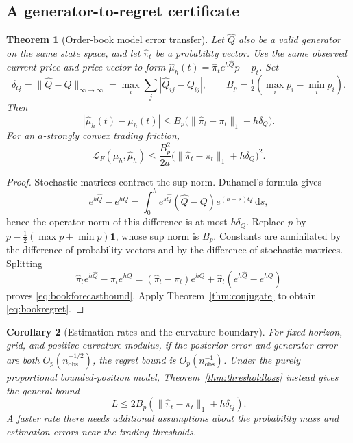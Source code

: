 \documentclass[11pt]{article}
\theoremstyle{plain}
\newtheorem{theorem}{Theorem}[section]
\newtheorem{corollary}[theorem]{Corollary}
\theoremstyle{definition}
\theoremstyle{remark}
\newcommand{\dd}{\,\mathrm d}
\newcommand{\norm}[1]{\lVert#1\rVert}
\begin{document}
\subsection{A generator-to-regret certificate}

\begin{theorem}[Order-book model error transfer]\label{thm:booktransfer}
Let \(\widehat Q\) also be a valid generator on the same state space,
and let \(\widehat\pi_t\) be a probability vector. Use the same observed
current price and price vector to form
\(\widehat\mu_h(t)=\widehat\pi_t e^{h\widehat Q}p-p_t\).
Set
\[
\delta_Q=\norm{\widehat Q-Q}_{\infty\to\infty}
=\max_i\sum_j|\widehat Q_{ij}-Q_{ij}|,\qquad
B_p=\tfrac12(\max_i p_i-\min_i p_i).
\]
Then
\begin{equation}\label{eq:bookforecastbound}
|\widehat\mu_h(t)-\mu_h(t)|
\le B_p\big(\norm{\widehat\pi_t-\pi_t}_1+h\delta_Q\big).
\end{equation}
For an \(a\)-strongly convex trading friction,
\begin{equation}\label{eq:bookregret}
\mathcal L_F(\mu_h,\widehat\mu_h)
\le\frac{B_p^2}{2a}
\big(\norm{\widehat\pi_t-\pi_t}_1+h\delta_Q\big)^2.
\end{equation}
\end{theorem}
\begin{proof}
Stochastic matrices contract the sup norm. Duhamel's formula gives
\[
e^{h\widehat Q}-e^{hQ}
=\int_0^h e^{s\widehat Q}(\widehat Q-Q)e^{(h-s)Q}\dd s,
\]
hence the operator norm of this difference is at most \(h\delta_Q\).
Replace \(p\) by
\(p-\frac12(\max p+\min p)\mathbf1\), whose sup norm is \(B_p\).
Constants are annihilated by the difference of probability vectors
and by the difference of stochastic matrices. Splitting
\[
\widehat\pi_t e^{h\widehat Q}-\pi_t e^{hQ}
=(\widehat\pi_t-\pi_t)e^{hQ}
 +\widehat\pi_t(e^{h\widehat Q}-e^{hQ})
\]
proves \eqref{eq:bookforecastbound}. Apply
Theorem~\ref{thm:conjugate} to obtain \eqref{eq:bookregret}.
\end{proof}

\begin{corollary}[Estimation rates and the curvature boundary]
For fixed horizon, grid, and positive curvature modulus, if the
posterior error and generator error are both \(O_p(n_{\mathrm{obs}}^{-1/2})\),
the regret bound is \(O_p(n_{\mathrm{obs}}^{-1})\).
Under the purely proportional bounded-position model,
Theorem~\ref{thm:thresholdloss} instead gives the general bound
\[
L\le2B_p(\norm{\widehat\pi_t-\pi_t}_1+h\delta_Q).
\]
A faster rate there needs additional assumptions about the probability
mass and estimation errors near the trading thresholds.
\end{corollary}
\end{document}
